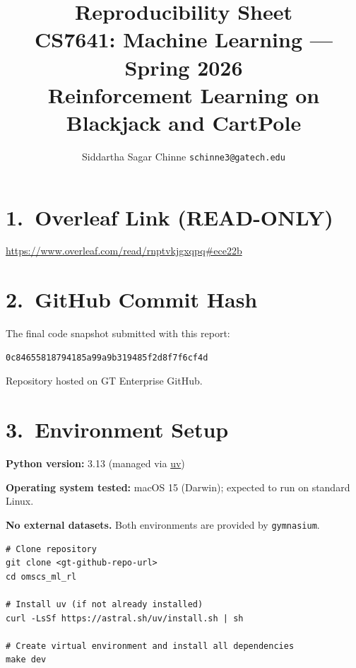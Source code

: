 \documentclass[letterpaper, 11pt]{article}
\title{\textbf{Reproducibility Sheet}\\[4pt]
\large CS7641: Machine Learning --- Spring 2026\\
Reinforcement Learning on Blackjack and CartPole}
\author{Siddartha Sagar Chinne \quad \texttt{schinne3@gatech.edu}}
\date{}
\begin{document}
\maketitle
\thispagestyle{fancy}

\section*{1.\ Overleaf Link (READ-ONLY)}

\begin{center}
\url{https://www.overleaf.com/read/rnptvkjgxqpq#ece22b}
\end{center}

\section*{2.\ GitHub Commit Hash}

The final code snapshot submitted with this report:

\begin{lstlisting}
0c84655818794185a99a9b319485f2d8f7f6cf4d
\end{lstlisting}

Repository hosted on GT Enterprise GitHub.

\section*{3.\ Environment Setup}

\textbf{Python version:} 3.13 (managed via \href{https://docs.astral.sh/uv/}{uv})

\textbf{Operating system tested:} macOS 15 (Darwin); expected to run on standard Linux.

\textbf{No external datasets.} Both environments are provided by \texttt{gymnasium}.

\begin{lstlisting}
# Clone repository
git clone <gt-github-repo-url>
cd omscs_ml_rl

# Install uv (if not already installed)
curl -LsSf https://astral.sh/uv/install.sh | sh

# Create virtual environment and install all dependencies
make dev
\end{lstlisting}
\end{document}
